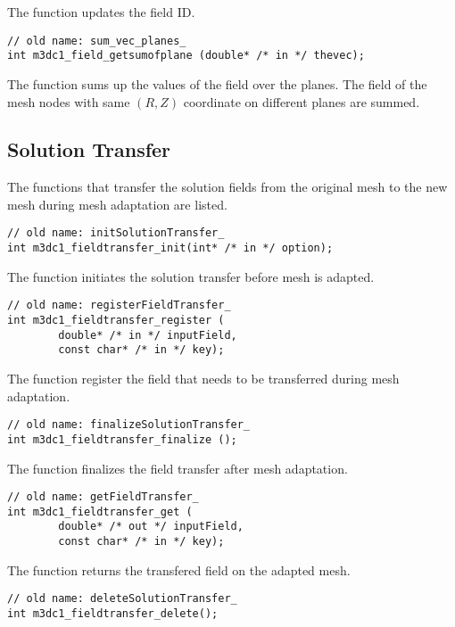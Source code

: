 The function updates the field ID.

\begin{verbatim}
// old name: sum_vec_planes_
int m3dc1_field_getsumofplane (double* /* in */ thevec); 
\end{verbatim}\vspace{-.5cm}\hspace{1cm}

The function sums up the values of the field over the planes. The field of the mesh nodes with same $(R,Z)$ coordinate on different planes are summed. 

\subsection{Solution Transfer}
The functions that transfer the solution fields from the original mesh to the new mesh during mesh adaptation are listed. 
\begin{verbatim}
// old name: initSolutionTransfer_
int m3dc1_fieldtransfer_init(int* /* in */ option); 
\end{verbatim}\vspace{-.5cm}\hspace{1cm}

The function initiates the solution transfer before mesh is adapted.

\begin{verbatim}
// old name: registerFieldTransfer_
int m3dc1_fieldtransfer_register ( 
        double* /* in */ inputField, 
        const char* /* in */ key); 
\end{verbatim}\vspace{-.5cm}\hspace{1cm}

The function register the field that needs to be transferred during mesh adaptation.

\begin{verbatim}
// old name: finalizeSolutionTransfer_
int m3dc1_fieldtransfer_finalize ();
\end{verbatim}\vspace{-.5cm}\hspace{1cm}

The function finalizes the field  transfer after mesh adaptation.

\begin{verbatim}
// old name: getFieldTransfer_
int m3dc1_fieldtransfer_get (
        double* /* out */ inputField, 
        const char* /* in */ key); 
\end{verbatim}\vspace{-.5cm}\hspace{1cm}
The function returns the transfered field on the adapted mesh. 
\begin{verbatim}
// old name: deleteSolutionTransfer_
int m3dc1_fieldtransfer_delete(); 
\end{verbatim}\vspace{-.5cm}\hspace{1cm}


